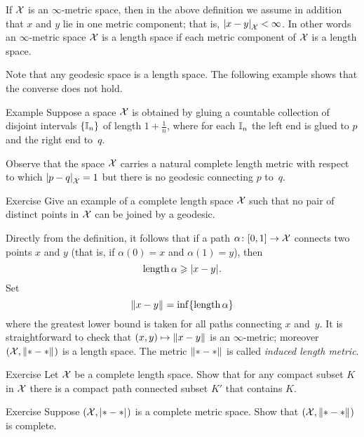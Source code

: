 If $\mathcal{X}$ is an $\infty$-metric space, then in the above definition we assume in addition that $x$ and $y$ lie in one metric component; that is, $\dist{x}{y}{\spc{X}}<\infty$.
In other words an $\infty$-metric space $\mathcal{X}$ is a length space if each metric component of $\mathcal{X}$ is a length space.

Note that any geodesic space is a length space.
The following example shows that the converse does not hold.


\begin{thm}{Example}
Suppose a space $\mathcal{X}$ is obtained by gluing a countable collection of disjoint intervals $\{\mathbb{I}_n\}$ of length $1+\tfrac1n$, where for each $\mathbb{I}_n$ the left end is glued to $p$ and the right end to~$q$.

Observe that the space $\mathcal{X}$ carries a natural complete length metric with respect to which $\dist{p}{q}{\spc{X}}=1$ but there is no geodesic connecting $p$ to~$q$.
\end{thm}

\begin{thm}{Exercise}\label{ex:no-geod}
Give an example of a complete length space $\mathcal{X}$ such that no pair of distinct points in $\mathcal{X}$ can be joined by a geodesic.
\end{thm}

Directly from the definition, it follows that if a path $\alpha\colon[0,1]\to\mathcal{X}$ connects two points $x$ and $y$ 
(that is, if $\alpha(0)=x$ and $\alpha(1)=y$), then 
\[\length\alpha\ge \dist{x}{y}{}.\]
Set 
\[\yetdist{x}{y}{}=\inf\{\length\alpha\}\]
where the greatest lower bound is taken for all paths connecting $x$ and~$y$.
It is straightforward to check that $(x,y)\mapsto \yetdist{x}{y}{}$ is an $\infty$-metric; moreover $(\spc{X},\yetdist{*}{*}{})$ is a length space.
The metric $\yetdist{*}{*}{}$ is called \emph{induced length metric}.

\begin{thm}{Exercise}\label{ex:compact+connceted}
Let $\mathcal{X}$ be a complete length space.
Show that for any compact subset $K$ in $\mathcal{X}$
there is a compact path connected subset $K'$ that contains $K$.  
\end{thm}

\begin{thm}{Exercise}\label{ex:compact=>complete}
Suppose $(\spc{X},\dist{*}{*}{})$ is a complete metric space.
Show that $(\spc{X},\yetdist{*}{*}{})$ is complete.
\end{thm}

